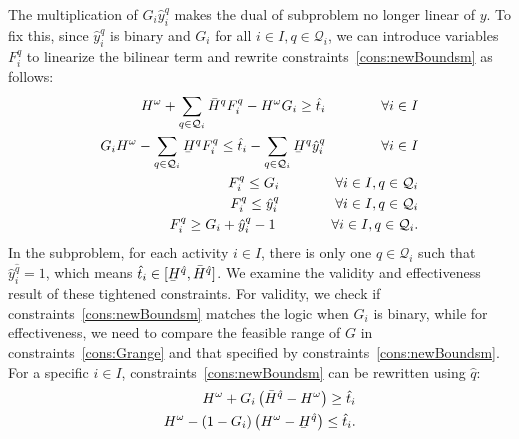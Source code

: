 \documentclass[11pt]{article}
\renewcommand{\underbar}{\underaccent{\bar}}
\begin{document}
	The multiplication of \(G_i \hat{y}_i^q\) makes the dual of subproblem no longer linear of \(y\). To fix this, since \(\hat{y}_i^q\) is binary and \(G_i\) for all \(i \in I, q \in \mathcal{Q}_i\), we can introduce variables \(F_i^q\) to linearize the bilinear term and rewrite constraints~\eqref{cons:newBoundsm} as follows:
	\begin{subequations} \label{cons:newBoundsmlin}
		\begin{align}
			H^\omega + \sum_{q \in \mathcal{Q}_i} \bar{H}^q F_i^q - H^\omega G_i \geq \hat{t}_i \qquad \qquad \forall i \in I \label{cons:FG1}\\
			G_i H^\omega - \sum_{q \in \mathcal{Q}_i} \underbar{H}^q F_i^q \leq \hat{t}_i - \sum_{q \in \mathcal{Q}_i} \underbar{H}^q \hat{y}_i^q \qquad \qquad \forall i \in I \label{cons:FG2}\\
			F_i^q \leq G_i \qquad \qquad \forall i \in I, q \in \mathcal{Q}_i \label{cons:FGlin1}\\
			F_i^q \leq \hat{y}_i^q \qquad \qquad \forall i \in I, q \in \mathcal{Q}_i \label{cons:FGlin2}\\
			F_i^q \geq G_i + \hat{y}_i^q - 1 \qquad \qquad \forall i \in I, q \in \mathcal{Q}_i. \label{cons:FGlin3}
		\end{align}
	\end{subequations}
	In the subproblem, for each activity \(i \in I\), there is only one \(\hat{q} \in \mathcal{Q}_i\) such that \(\hat{y}_i^{\hat{q}} = 1\), which means \(\hat{t}_i \in 
	[\underbar{H}^{\hat{q}},\bar{H}^{\hat{q}}]\). 
	We examine the validity and effectiveness result of these tightened constraints. For validity, we check if constraints~\eqref{cons:newBoundsm} matches the logic when \(G_i\) is binary, while for effectiveness, we need to compare the feasible range of \(G\) in constraints~\eqref{cons:Grange} and that specified by constraints~\eqref{cons:newBoundsm}. \\
	\newline
	For a specific \(i \in I\), constraints~\eqref{cons:newBoundsm} can be rewritten using \(\hat{q}\):
	\begin{subequations} \label{cons:sGnew}
		\begin{align}
		H^\omega + G_i \left( \bar{H}^{\hat{q}} - H^\omega \right) \geq \hat{t}_i \label{cons:sGnew1}\\
		H^\omega - (1 - G_i) \left(H^\omega - \underbar{H}^{\hat{q}} \right) \leq \hat{t}_i. \label{cons:sGnew2}
		\end{align}
	\end{subequations}
\end{document}
